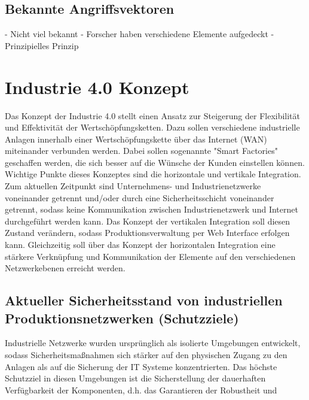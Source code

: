 \subsection{Bekannte Angriffsvektoren}
- Nicht viel bekannt
- Forscher haben verschiedene Elemente aufgedeckt
- Prinzipielles Prinzip

\section{Industrie 4.0 Konzept}
Das Konzept der Industrie 4.0 stellt einen Ansatz zur Steigerung der Flexibilität und Effektivität der Wertschöpfungsketten. Dazu sollen verschiedene industrielle Anlagen innerhalb einer Wertschöpfungskette über das Internet (WAN) miteinander verbunden werden. Dabei sollen sogenannte "Smart Factories" geschaffen werden, die sich besser auf die Wünsche der Kunden einstellen können. Wichtige Punkte dieses Konzeptes sind die horizontale und vertikale Integration. Zum aktuellen Zeitpunkt sind Unternehmens- und Industrienetzwerke voneinander getrennt und/oder durch eine Sicherheitsschicht voneinander getrennt, sodass keine Kommunikation zwischen Industrienetzwerk und Internet durchgeführt werden kann. Das Konzept der vertikalen Integration soll diesen Zustand verändern, sodass Produktionsverwaltung per Web Interface erfolgen kann. Gleichzeitig soll über das Konzept der horizontalen Integration eine stärkere Verknüpfung und Kommunikation der Elemente auf den verschiedenen Netzwerkebenen erreicht werden.


\subsection{Aktueller Sicherheitsstand von industriellen Produktionsnetzwerken (Schutzziele)}
Industrielle Netzwerke wurden ursprünglich als isolierte Umgebungen entwickelt, sodass Sicherheitsmaßnahmen sich stärker auf den physischen Zugang zu den Anlagen als auf die Sicherung der IT Systeme konzentrierten. Das höchste Schutzziel in diesen Umgebungen ist die Sicherstellung der dauerhaften Verfügbarkeit der Komponenten, d.h. das Garantieren der Robustheit und 

